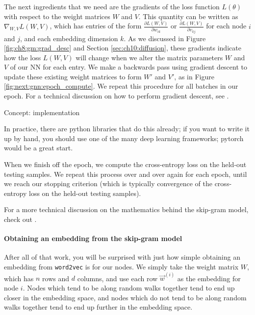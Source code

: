 The next ingredients that we need are the gradients of the loss function $L(\theta)$ with respect to the weight matrices $W$ and $V$. This quantity can be written as $\nabla_{W, V} L(W, V)$, which has entries of the form $\frac{\partial L(W, V)}{\partial w_{ik}}$ or $\frac{\partial L(W, V)}{\partial v_{kj}}$ for each node $i$ and $j$, and each embedding dimension $k$. As we discussed in Figure \ref{fig:ch8:gm:grad_desc} and Section \ref{sec:ch10:diffusion}, these gradients indicate how the loss $L(W, V)$ will change when we alter the matrix parameters $W$ and $V$ of our NN for each entry. We make a backwards pass using gradient descent to update these existing weight matrices to form $W'$ and $V'$, as in Figure \ref{fig:next:gnn:epoch_compute}. We repeat this procedure for all batches in our epoch. For a technical discussion on how to perform gradient descent, see \cite{goodfellow2016deep}.

\begin{floatingbox}\caption{Concept: implementation}
    In practice, there are python libraries that do this already; if you want to write it up by hand, you should use one of the many deep learning frameworks; pytorch would be a great start.
\end{floatingbox}

When we finish off the epoch, we compute the cross-entropy loss on the held-out testing samples. We repeat this process over and over again for each epoch, until we reach our stopping criterion (which is typically convergence of the cross-entropy loss on the held-out testing samples).

For a more technical discussion on the mathematics behind the skip-gram model, check out \cite{PourNejatian2021Dec}.

\paragraph*{Obtaining an embedding from the skip-gram model}

After all of that work, you will be surprised with just how simple obtaining an embedding from \texttt{word2vec} is for our nodes. We simply take the weight matrix $W$, which has $n$ rows and $d$ columns, and use each row $\vec w^{(i)}$ as the embedding for node $i$. Nodes which tend to be along random walks together tend to end up closer in the embedding space, and nodes which do not tend to be along random walks together tend to end up further in the embedding space. 

